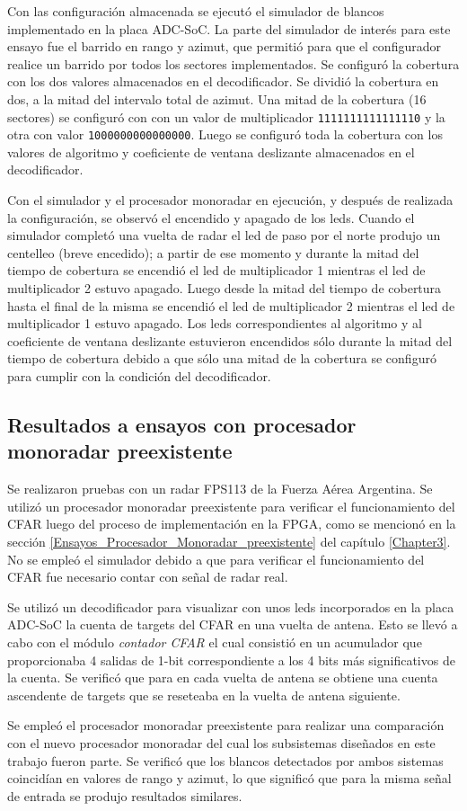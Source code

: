 Con las configuración almacenada se ejecutó el simulador de blancos implementado en la placa ADC-SoC. La parte del simulador de interés para este ensayo fue el barrido en rango y azimut, que permitió para que el configurador realice un barrido por todos los sectores implementados. Se configuró la cobertura con los dos valores almacenados en el decodificador. Se dividió la cobertura en dos, a la mitad del intervalo total de azimut. Una mitad de la cobertura (16 sectores) se configuró con con un valor de multiplicador \texttt{1111111111111110} y la otra con valor \texttt{1000000000000000}. Luego se configuró toda la cobertura con los valores de algoritmo y coeficiente de ventana deslizante almacenados en el decodificador.

Con el simulador y el procesador monoradar en ejecución, y después de realizada la configuración, se observó el encendido y apagado de los leds. Cuando el simulador completó una vuelta de radar el led de paso por el norte produjo un centelleo (breve encedido); a partir de ese momento y durante la mitad del tiempo de cobertura se encendió el led de multiplicador 1 mientras el led de multiplicador 2 estuvo apagado. Luego desde la mitad del tiempo de cobertura hasta el final de la misma se encendió el led de multiplicador 2 mientras el led de multiplicador 1 estuvo apagado. Los leds correspondientes al algoritmo y al coeficiente de ventana deslizante estuvieron encendidos sólo durante la mitad del tiempo de cobertura debido a que sólo una mitad de la cobertura se configuró para cumplir con la condición del decodificador.

\subsection{Resultados a ensayos con procesador monoradar preexistente}
\label{Subsec: Resultados a procesador monoradar preexistente}

Se realizaron pruebas con un radar FPS113 de la Fuerza Aérea Argentina. Se utilizó un procesador monoradar preexistente para verificar el funcionamiento del CFAR luego del proceso de implementación en la FPGA, como se mencionó en la sección \ref{Ensayos_Procesador_Monoradar_preexistente} del capítulo \ref{Chapter3}. No se empleó el simulador debido a que para verificar el funcionamiento del CFAR fue necesario contar con señal de radar real.

Se utilizó un decodificador para visualizar con unos leds incorporados en la placa ADC-SoC la cuenta de targets del CFAR en una vuelta de antena. Esto se llevó a cabo con el módulo \textit{contador CFAR} el cual consistió en un acumulador que proporcionaba 4 salidas de 1-bit correspondiente a los 4 bits más significativos de la cuenta. Se verificó que para en cada vuelta de antena se obtiene una cuenta ascendente de targets que se reseteaba en la vuelta de antena siguiente.

Se empleó el procesador monoradar preexistente para realizar una comparación con el nuevo procesador monoradar del cual los subsistemas diseñados en este trabajo fueron parte. Se verificó que los blancos detectados por ambos sistemas coincidían en valores de rango y azimut, lo que significó que para la misma señal de entrada se produjo resultados similares.